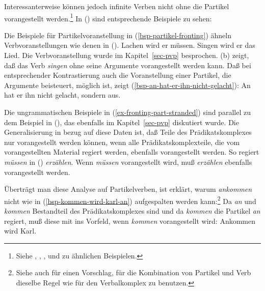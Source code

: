 Interessanterweise können jedoch infinite Verben nicht ohne die Partikel vorangestellt werden.\footnote{
        Siehe , , , %
         und  zu ähnlichen Beispielen.
}
In () sind entsprechende Beispiele zu sehen:
\eal
\label{ex-fronting-part-stranded}
\zl

\noindent
Die Beispiele für Partikelvoranstellung in (\ref{bsp-partikel-fronting}) ähneln Verbvoranstellungen wie denen in ().
\eal
\ex Lachen wird er müssen.
\ex Singen wird er das Lied.
\zl
Die Verbvoranstellung wurde im Kapitel~\ref{sec-pvp} besprochen. (b) zeigt,
daß das Verb \emph{singen} ohne seine Argumente vorangestellt werden kann.
Daß bei entsprechender Kontrastierung auch die Voranstellung einer Partikel,
die Argumente beisteuert, möglich ist, zeigt (\ref{bsp-an-hat-er-ihn-nicht-gelacht}):
\ea
\label{bsp-an-hat-er-ihn-nicht-gelacht}
An hat er ihn nicht gelacht, sondern aus.
\z

\noindent
Die ungrammatischen Beispiele in (\ref{ex-fronting-part-stranded}) sind
parallel zu dem Beispiel in (), das ebenfalls im Kapitel~\ref{sec-pvp}
diskutiert wurde.
\label{ex-muessen-wird-er-ihr-zwei}
\z
Die Generalisierung in bezug auf diese Daten ist, daß Teile des Prädikatskomplexes
nur vorangestellt werden können, wenn alle Prädikatskomplexteile, die vom vorangestellten
Material regiert werden, ebenfalls vorangestellt werden.
So regiert \zb \emph{müssen} in () {\em erzählen}.
Wenn \emph{müssen} vorangestellt wird, muß \emph{erzählen} ebenfalls vorangestellt werden.

Überträgt man diese Analyse auf Partikelverben, ist erklärt, warum \zb \emph{ankommen}
nicht wie in (\ref{bsp-kommen-wird-karl-an}) aufgespalten werden kann:\footnote{
  Siehe auch  für einen Vorschlag, für die
  Kombination von Partikel und Verb dieselbe Regel wie für den Verbalkomplex zu benutzen.%
}
Da \emph{an} und \emph{kommen}
Bestandteil des Prädikatskomplexes sind und da \emph{kommen} die Partikel \emph{an} regiert,
muß diese mit ins Vorfeld, wenn \emph{kommen} vorangestellt wird:
\ea
Ankommen wird Karl.
\z
{}



